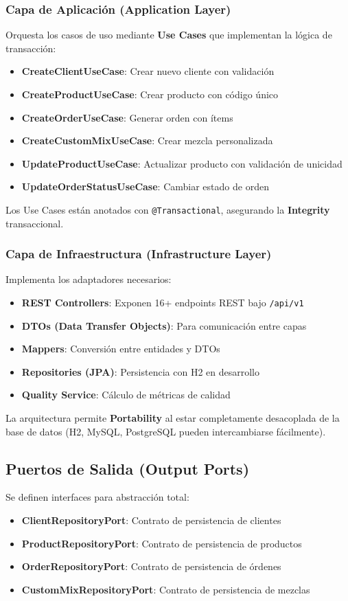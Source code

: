 \documentclass[12pt,a4paper]{article}
\begin{document}
\subsubsection{Capa de Aplicación (Application Layer)}
Orquesta los casos de uso mediante \textbf{Use Cases} que implementan la lógica de transacción:
\begin{itemize}
    \item \textbf{CreateClientUseCase}: Crear nuevo cliente con validación
    \item \textbf{CreateProductUseCase}: Crear producto con código único
    \item \textbf{CreateOrderUseCase}: Generar orden con ítems
    \item \textbf{CreateCustomMixUseCase}: Crear mezcla personalizada
    \item \textbf{UpdateProductUseCase}: Actualizar producto con validación de unicidad
    \item \textbf{UpdateOrderStatusUseCase}: Cambiar estado de orden
\end{itemize}

Los Use Cases están anotados con \texttt{@Transactional}, asegurando la \textbf{Integrity} transaccional.

\subsubsection{Capa de Infraestructura (Infrastructure Layer)}
Implementa los adaptadores necesarios:
\begin{itemize}
    \item \textbf{REST Controllers}: Exponen 16+ endpoints REST bajo \texttt{/api/v1}
    \item \textbf{DTOs (Data Transfer Objects)}: Para comunicación entre capas
    \item \textbf{Mappers}: Conversión entre entidades y DTOs
    \item \textbf{Repositories (JPA)}: Persistencia con H2 en desarrollo
    \item \textbf{Quality Service}: Cálculo de métricas de calidad
\end{itemize}

La arquitectura permite \textbf{Portability} al estar completamente desacoplada de la base de datos (H2, MySQL, PostgreSQL pueden intercambiarse fácilmente).

\subsection{Puertos de Salida (Output Ports)}
Se definen interfaces para abstracción total:
\begin{itemize}
    \item \textbf{ClientRepositoryPort}: Contrato de persistencia de clientes
    \item \textbf{ProductRepositoryPort}: Contrato de persistencia de productos
    \item \textbf{OrderRepositoryPort}: Contrato de persistencia de órdenes
    \item \textbf{CustomMixRepositoryPort}: Contrato de persistencia de mezclas
\end{itemize}
\end{document}
